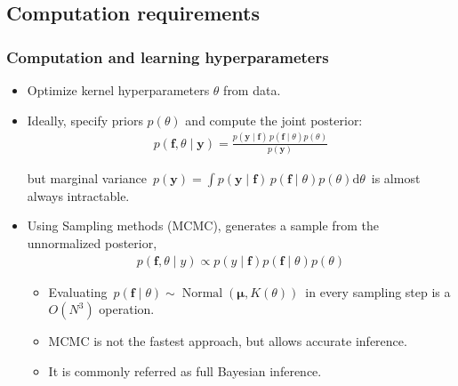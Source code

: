 \documentclass[8pt]{beamer} %
\DeclareMathOperator{\Normal}{Normal}
\begin{document}
\subsection*{Computation requirements}
\begin{frame}\frametitle{\normalsize Computation and learning hyperparameters}

\begin{itemize}\setlength\itemsep{2mm}
\item Optimize kernel hyperparameters $\theta$ from data.

\item Ideally, specify priors $p(\theta)$ and compute the joint posterior:
 \begin{align*}
	p(\bm{f},\theta \mid \bm{y}) = \frac{p(\bm{y}\mid \bm{f})\, p(\bm{f}\mid\theta) p(\theta)}{p(\bm{y})}
 \end{align*}
 
but marginal variance\, $p(\bm{y}) = \int p(\bm{y}\mid \bm{f})\, p(\bm{f}\mid\theta) p(\theta)\mathrm{d}\theta$\, is almost always intractable.

\vspace{5mm}
\item Using {\color{navyblue} Sampling methods} (MCMC), generates a sample from the unnormalized posterior, %
%
\begin{align*}
p(\bm{f},\theta\mid y) \propto p(y\mid\bm{f})p(\bm{f}\mid\theta)p(\theta)
\end{align*}

\begin{itemize}\setlength\itemsep{2mm}
\item Evaluating\, $p(\bm{f} \mid\theta) \sim \Normal(\bm{\mu}, K(\theta))$\,  in every sampling step is a\, {\color{navyblue} $O(N^3)$ operation}.\\[2mm]

\vspace{-1mm}
\item MCMC {\color{navyblue} is not the fastest} approach, but allows {\color{navyblue} accurate inference}.
\item It is commonly referred as {\color{navyblue}full Bayesian inference}.
\end{itemize}
\end{itemize}
\end{frame}
\end{document}
